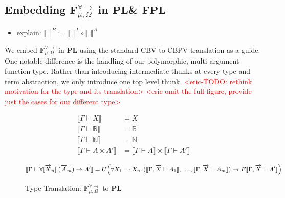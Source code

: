 \documentclass[acmsmall]{acmart}
\newcommand{\den}[1]{\llbracket #1\rrbracket}
\newcommand{\eric}[1]{\textcolor{red}{ <eric-#1> }}
\newcommand{\source}{$\mathbf{F}_{\mu,\Omega}^{\forall\to}\;$}
\newcommand{\pl}{$\mathbf{PL}$}
\newcommand{\fpl}{$\mathbf{FPL}$}
\begin{document}
\subsection{Embedding \source in \pl\;\& \fpl}\label{sec:SourceToPL}
\begin{itemize}
  \item explain: $\den{\_}^B := \den{\_}^L \circ \den{\_}^A$
\end{itemize}
We embed \source in \pl\; using the standard CBV-to-CBPV translation\cite{CBPV} as a guide. One notable difference is the handling of our polymorphic, multi-argument function type. Rather than introducing intermediate thunks at every type and term abstraction, we only introduce one top level thunk. \eric{TODO: rethink motivation for the type and its translation}
\eric{omit the full figure, provide just the cases for our different type}



\begin{figure}[H]
\centering
\scriptsize
\begin{align*}
\den{\Gamma \vdash X} &= X \\
\den{\Gamma \vdash \mathbb{B}} &= \mathbb{B} \\
\den{\Gamma \vdash \mathbb{N}} &= \mathbb{N} \\
\den{\Gamma \vdash A\times A'} &= \den{\Gamma \vdash A}\times \den{\Gamma \vdash A'} \\
\end{align*}
\[
\den{\Gamma \vdash \forall[\overrightarrow{X}_n].(\overrightarrow{A}_m)\to A'} 
= U\Bigl(\forall X_1\cdots X_n.\,(\den{\Gamma,\overrightarrow{X}\vdash A_1}, \ldots, \den{\Gamma,\overrightarrow{X}\vdash A_m}) \to F\den{\Gamma,\overrightarrow{X}\vdash A'}\Bigr)
\]
\caption{Type Translation: \source to \pl}
\end{figure}
\end{document}
